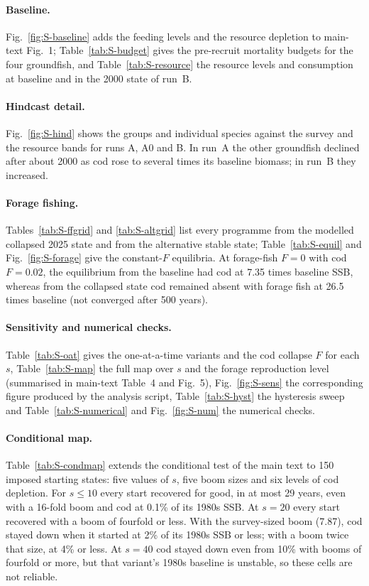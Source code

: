 \documentclass[11pt,letterpaper,fleqn]{article}
\begin{document}
\paragraph{Baseline.} Fig.~\ref{fig:S-baseline} adds the feeding levels and the resource depletion to main-text Fig.~1; Table~\ref{tab:S-budget} gives the pre-recruit mortality budgets for the four groundfish, and Table~\ref{tab:S-resource} the resource levels and consumption at baseline and in the 2000 state of run~B.

\paragraph{Hindcast detail.} Fig.~\ref{fig:S-hind} shows the groups and individual species against the survey and the resource bands for runs A, A0 and B. In run~A the other groundfish declined after about 2000 as cod rose to several times its baseline biomass; in run~B they increased.

\paragraph{Forage fishing.} Tables~\ref{tab:S-ffgrid} and \ref{tab:S-altgrid} list every programme from the modelled collapsed 2025 state and from the alternative stable state; Table~\ref{tab:S-equil} and Fig.~\ref{fig:S-forage} give the constant-$F$ equilibria. At forage-fish $F=0$ with cod $F=0.02$, the equilibrium from the baseline had cod at 7.35 times baseline SSB, whereas from the collapsed state cod remained absent with forage fish at 26.5 times baseline (not converged after 500 years).

\paragraph{Sensitivity and numerical checks.} Table~\ref{tab:S-oat} gives the one-at-a-time variants and the cod collapse $F$ for each $s$, Table~\ref{tab:S-map} the full map over $s$ and the forage reproduction level (summarised in main-text Table~4 and Fig.~5), Fig.~\ref{fig:S-sens} the corresponding figure produced by the analysis script, Table~\ref{tab:S-hyst} the hysteresis sweep and Table~\ref{tab:S-numerical} and Fig.~\ref{fig:S-num} the numerical checks.

\paragraph{Conditional map.} Table~\ref{tab:S-condmap} extends the conditional test of the main text to 150 imposed starting states: five values of $s$, five boom sizes and six levels of cod depletion. For $s\leq10$ every start recovered for good, in at most 29 years, even with a 16-fold boom and cod at 0.1\% of its 1980s SSB. At $s=20$ every start recovered with a boom of fourfold or less. With the survey-sized boom (7.87), cod stayed down when it started at 2\% of its 1980s SSB or less; with a boom twice that size, at 4\% or less. At $s=40$ cod stayed down even from 10\% with booms of fourfold or more, but that variant's 1980s baseline is unstable, so these cells are not reliable.
\end{document}
